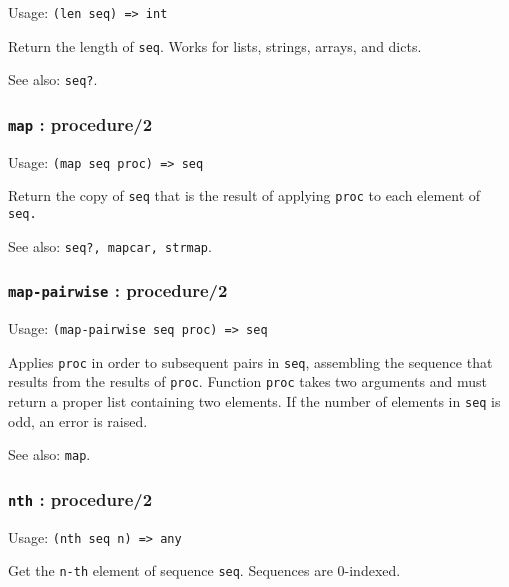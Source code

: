 \documentclass[
]{article}
\newcommand{\passthrough}[1]{#1}
\begin{document}
Usage: \passthrough{\lstinline!(len seq) => int!}

Return the length of \passthrough{\lstinline!seq!}. Works for lists,
strings, arrays, and dicts.

See also: \passthrough{\lstinline!seq?!}.

\hypertarget{map-procedure2}{%
\subsubsection{\texorpdfstring{\texttt{map} :
procedure/2}{map : procedure/2}}\label{map-procedure2}}

Usage: \passthrough{\lstinline!(map seq proc) => seq!}

Return the copy of \passthrough{\lstinline!seq!} that is the result of
applying \passthrough{\lstinline!proc!} to each element of
\passthrough{\lstinline!seq.!}

See also: \passthrough{\lstinline!seq?, mapcar, strmap!}.

\hypertarget{map-pairwise-procedure2}{%
\subsubsection{\texorpdfstring{\texttt{map-pairwise} :
procedure/2}{map-pairwise : procedure/2}}\label{map-pairwise-procedure2}}

Usage: \passthrough{\lstinline!(map-pairwise seq proc) => seq!}

Applies \passthrough{\lstinline!proc!} in order to subsequent pairs in
\passthrough{\lstinline!seq!}, assembling the sequence that results from
the results of \passthrough{\lstinline!proc!}. Function
\passthrough{\lstinline!proc!} takes two arguments and must return a
proper list containing two elements. If the number of elements in
\passthrough{\lstinline!seq!} is odd, an error is raised.

See also: \passthrough{\lstinline!map!}.

\hypertarget{nth-procedure2}{%
\subsubsection{\texorpdfstring{\texttt{nth} :
procedure/2}{nth : procedure/2}}\label{nth-procedure2}}

Usage: \passthrough{\lstinline!(nth seq n) => any!}

Get the \passthrough{\lstinline!n-th!} element of sequence
\passthrough{\lstinline!seq!}. Sequences are 0-indexed.
\end{document}
